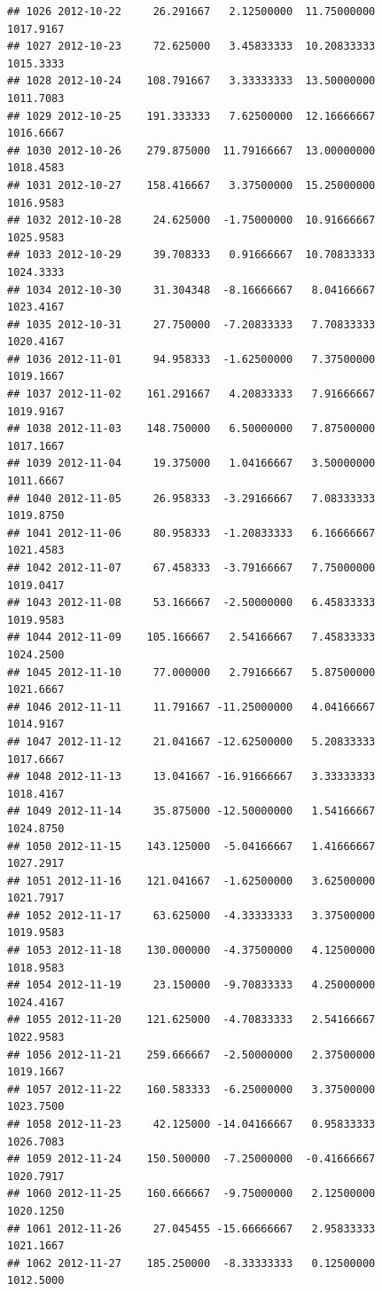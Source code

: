 \documentclass[
]{article}
\begin{document}
\begin{verbatim}
## 1026 2012-10-22     26.291667   2.12500000  11.75000000    1017.9167
## 1027 2012-10-23     72.625000   3.45833333  10.20833333    1015.3333
## 1028 2012-10-24    108.791667   3.33333333  13.50000000    1011.7083
## 1029 2012-10-25    191.333333   7.62500000  12.16666667    1016.6667
## 1030 2012-10-26    279.875000  11.79166667  13.00000000    1018.4583
## 1031 2012-10-27    158.416667   3.37500000  15.25000000    1016.9583
## 1032 2012-10-28     24.625000  -1.75000000  10.91666667    1025.9583
## 1033 2012-10-29     39.708333   0.91666667  10.70833333    1024.3333
## 1034 2012-10-30     31.304348  -8.16666667   8.04166667    1023.4167
## 1035 2012-10-31     27.750000  -7.20833333   7.70833333    1020.4167
## 1036 2012-11-01     94.958333  -1.62500000   7.37500000    1019.1667
## 1037 2012-11-02    161.291667   4.20833333   7.91666667    1019.9167
## 1038 2012-11-03    148.750000   6.50000000   7.87500000    1017.1667
## 1039 2012-11-04     19.375000   1.04166667   3.50000000    1011.6667
## 1040 2012-11-05     26.958333  -3.29166667   7.08333333    1019.8750
## 1041 2012-11-06     80.958333  -1.20833333   6.16666667    1021.4583
## 1042 2012-11-07     67.458333  -3.79166667   7.75000000    1019.0417
## 1043 2012-11-08     53.166667  -2.50000000   6.45833333    1019.9583
## 1044 2012-11-09    105.166667   2.54166667   7.45833333    1024.2500
## 1045 2012-11-10     77.000000   2.79166667   5.87500000    1021.6667
## 1046 2012-11-11     11.791667 -11.25000000   4.04166667    1014.9167
## 1047 2012-11-12     21.041667 -12.62500000   5.20833333    1017.6667
## 1048 2012-11-13     13.041667 -16.91666667   3.33333333    1018.4167
## 1049 2012-11-14     35.875000 -12.50000000   1.54166667    1024.8750
## 1050 2012-11-15    143.125000  -5.04166667   1.41666667    1027.2917
## 1051 2012-11-16    121.041667  -1.62500000   3.62500000    1021.7917
## 1052 2012-11-17     63.625000  -4.33333333   3.37500000    1019.9583
## 1053 2012-11-18    130.000000  -4.37500000   4.12500000    1018.9583
## 1054 2012-11-19     23.150000  -9.70833333   4.25000000    1024.4167
## 1055 2012-11-20    121.625000  -4.70833333   2.54166667    1022.9583
## 1056 2012-11-21    259.666667  -2.50000000   2.37500000    1019.1667
## 1057 2012-11-22    160.583333  -6.25000000   3.37500000    1023.7500
## 1058 2012-11-23     42.125000 -14.04166667   0.95833333    1026.7083
## 1059 2012-11-24    150.500000  -7.25000000  -0.41666667    1020.7917
## 1060 2012-11-25    160.666667  -9.75000000   2.12500000    1020.1250
## 1061 2012-11-26     27.045455 -15.66666667   2.95833333    1021.1667
## 1062 2012-11-27    185.250000  -8.33333333   0.12500000    1012.5000

\end{verbatim}
\end{document}
